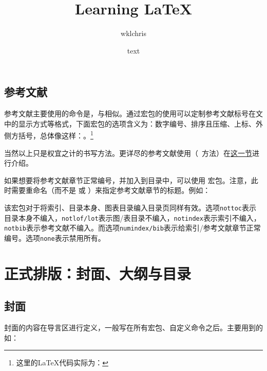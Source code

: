 \subsection{参考文献}
\label{subsec:cite}
参考文献主要使用的命令是，与相似。通过宏包的使用可以定制参考文献标号在文中的显示方式等格式，下面宏包的选项含义为：数字编号、排序且压缩、上标、外侧方括号，总体像这样：\textsuperscript{\ttfamily [1,3-5]}。\footnote{这里的LaTeX代码实际为：}

当然以上只是权宜之计的书写方法。更详尽的参考文献使用（\bibtex\ 方法）在\hyperref[sec:bibtex]{\bibtex{}这一节}进行介绍。

如果想要将参考文献章节正常编号，并加入到目录中，可以使用  宏包\label{pkg:tocbibind}。注意，此时需要重命名（而不是  或 ）来指定参考文献章节的标题。例如：
\begin{latex}
\usepackage[nottoc,numbib]{tocbibind}
\renewcommand{\tocbibname}{References}
\end{latex}

该宏包对于将索引、目录本身、图表目录编入目录页同样有效。选项\texttt{nottoc}表示目录本身不编入，\texttt{notlof/lot}表示图/表目录不编入，\texttt{notindex}表示索引不编入，\texttt{notbib}表示参考文献不编入。而选项\texttt{numindex/bib}表示给索引/参考文献章节正常编号。选项\texttt{none}表示禁用所有。

\section{正式排版：封面、大纲与目录}

\subsection{封面}
封面的内容在导言区进行定义，一般写在所有宏包、自定义命令之后。主要用到的如：
\begin{latex}
\title{Learning LaTeX}
\author{wklchris}
\date{text}
\end{latex}

